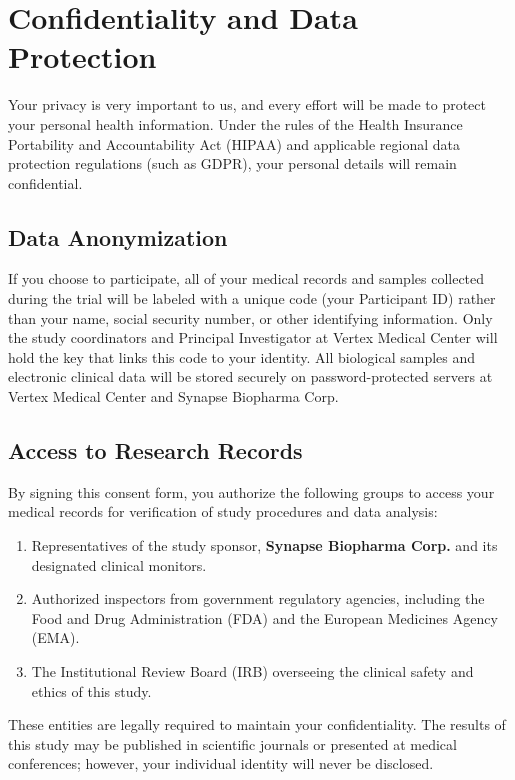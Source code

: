 \section{Confidentiality and Data Protection}
Your privacy is very important to us, and every effort will be made to protect your personal health information. Under the rules of the Health Insurance Portability and Accountability Act (HIPAA) and applicable regional data protection regulations (such as GDPR), your personal details will remain confidential.

\subsection{Data Anonymization}
If you choose to participate, all of your medical records and samples collected during the trial will be labeled with a unique code (your Participant ID) rather than your name, social security number, or other identifying information. Only the study coordinators and Principal Investigator at Vertex Medical Center will hold the key that links this code to your identity. All biological samples and electronic clinical data will be stored securely on password-protected servers at Vertex Medical Center and Synapse Biopharma Corp.

\subsection{Access to Research Records}
By signing this consent form, you authorize the following groups to access your medical records for verification of study procedures and data analysis:
\begin{enumerate}
    \item Representatives of the study sponsor, \textbf{Synapse Biopharma Corp.} and its designated clinical monitors.
    \item Authorized inspectors from government regulatory agencies, including the Food and Drug Administration (FDA) and the European Medicines Agency (EMA).
    \item The Institutional Review Board (IRB) overseeing the clinical safety and ethics of this study.
\end{enumerate}
These entities are legally required to maintain your confidentiality. The results of this study may be published in scientific journals or presented at medical conferences; however, your individual identity will never be disclosed.
